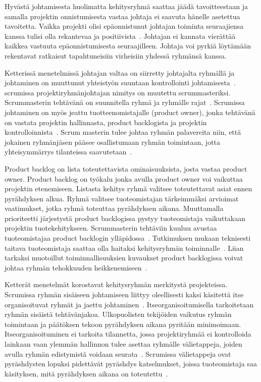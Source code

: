 \documentclass[finnish]{tktltiki2}
\theoremstyle{definition}
\theoremstyle{remark}
\begin{document}
Hyvästä johtamisesta huolimatta kehitysryhmä saattaa jäädä tavoitteestaan ja samalla projektin onnistumisesta vastaa johtaja ei saavuta hänelle asetettua tavoitetta. Vaikka projekti olisi epäonnistunut johtajan toiminta seuraajiensa kanssa tulisi olla rekantevaa ja positiivista~\cite{raccoon2006leadership}. Johtajan ei kannata vierättää kaikkea vastuuta epäonnistumisesta seuraajilleen. Johtaja voi pyrkiä löytämään rekentavat ratkaisut tapahtuneisiin virheisiin yhdessä ryhmänsä kanssa. 

Ketterissä menetelmissä johtajan valtaa on siirretty johtajalta ryhmällä ja johtaminen on muuttunut yhteistyön suuntaan kontrollointi johtamisesta~\cite{Nerur:2005:CMA:1060710.1060712}. scrumissa projektiryhmänjohtajan nimitys on muutettu scrummasteriksi. Scrummasterin tehtävänä on suunnitella ryhmä ja ryhmälle rajat~\cite{4755768}. Scrumissa johtaminen on myös jeattu tuotteenomistajalle (product owner), jonka tehtävänä on vastata projektin hallinnasta, product backlogista ja projektin kontrolloinnista~\cite{4755768}. Scrum masterin tulee johtaa ryhmän palavereita niin, että jokainen ryhmänjäsen pääsee osallistumaan ryhmän toimintaan, jotta yhteisymmärrys tilanteissa saavutetaan~\cite{bradley1997effect}. 

Product backlog on lista toteutettavista ominaisuuksista, josta vastaa product owner. Product backlog on työkalu jonka avulla product owner voi vaikuttaa projektin etenemiseen. Listasta kehitys ryhmä valitsee toteutettavat asiat ennen pyrähdyksen alkua. Ryhmä valitsee tuoteomistajan tärkeimmäksi arvioimat vaatimukset, jotka ryhmä toteuttaa pyrähdyksen aikana. Muuttamalla prioriteetti järjestystä product backlogissa pystyy tuoteomistaja vaikuttakaan projektin tuotekehitykseen. Scrummasterin tehtäviin kuuluu avustaa tuoteomistajaa product backlogin ylläpidossa~\cite{Nerur:2005:CMA:1060710.1060712}. Tutkimuksen mukaan teknisesti taitava tuoteomistaja saattaa olla haitaksi kehitysryhmän toiminnalle~\cite{Nerur:2005:CMA:1060710.1060712}. Liian tarkaksi muotoillut toiminnallisuuksien kuvaukset product backlogissa voivat johtaa ryhmän tehokkuuden heikkenemiseen~\cite{Nerur:2005:CMA:1060710.1060712}.

Ketterät menetelmät korostavat kehitysryhmän merkitystä projekteissa. Scrumissa ryhmän sisäiseen johtamiseen liittyy oleellisesti kaksi käsitettä itse organisoituvat ryhmät ja jaettu johtaminen~\cite{4755768}. Itseorganisoitumisella tarkoitetaan ryhmän sisäistä tehtävänjakoa. Ulkopuolisten tekijöiden vaikutus ryhmän toimintaan ja päätöksen tekoon pyrähdyksen aikana pyritään minimoimaan. Itseorganisoituminen ei tarkoita tilannetta, jossa projektiryhmää ei kontrolloida lainkaan vaan ylemmän hallinnon tulee asettaa ryhmälle välietappeja, joiden avulla ryhmän edistymistä voidaan seurata~\cite{Nerur:2005:CMA:1060710.1060712}. Scrumissa välietappeja ovat pyräshdysten lopuksi pidettävät pyräshdys katselmukset, joissa tuoteomistaja saa käsityksen, mitä pyrähdyksen aikana on toteutettu~\cite{schwaber1995scrum}.
\end{document}
